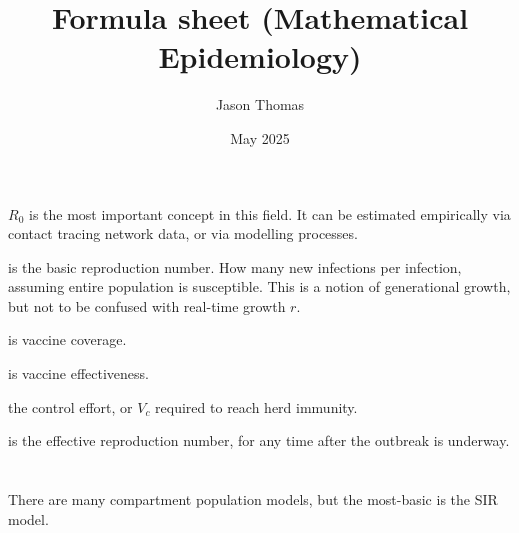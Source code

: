 \documentclass[twocolumn]{article}
\title{Formula sheet (Mathematical Epidemiology)}
\author{Jason Thomas}
\date{May 2025}
\begin{document}
\maketitle

\section*{}

$ R_0 $ is the most important concept in this field. It can be estimated empirically via contact tracing network data, or via modelling processes.

\begin{description}[leftmargin=1cm, style=nextline]

  \item[$ R_0 $]
     is the basic reproduction number. How many new infections per infection, assuming entire population is susceptible. This is a notion of generational growth, but not to be confused with real-time growth $ r $.
  \item[$ V_c $]
     is vaccine coverage.
  \item[$ V_e \in {[0,1]} $]
    is vaccine effectiveness.
  \item[$ \left(1 - \frac{1}{R_0} \right) / V_e $]
    the control effort, or $ V_c $ required to reach herd immunity.
  \item[$ R = (1-V_c) R_0 + V_c R_0 (1-V_e) $]
    is the effective reproduction number, for any time after the outbreak is underway.
\end{description}

\section*{}

There are many compartment population models, but the most-basic is the SIR model.
\end{document}

